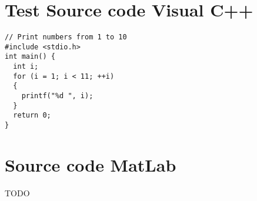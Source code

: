 

\section{Test Source code Visual C++}


\begin{lstlisting}[caption={[Demo] For loop to print numbers from 1 to 10}]
// Print numbers from 1 to 10
#include <stdio.h>
int main() {
  int i;
  for (i = 1; i < 11; ++i)
  {
    printf("%d ", i);
  }
  return 0;
}
\end{lstlisting}


\section{Source code MatLab}

\Large{TODO}
